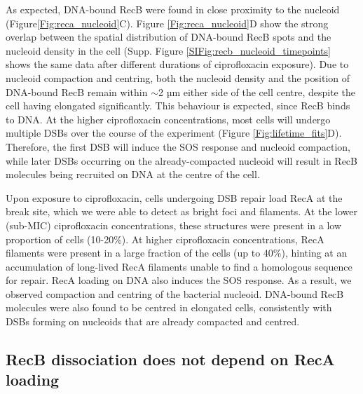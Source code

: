 As expected, DNA-bound RecB were found in close proximity to the nucleoid (Figure\ref{Fig:reca_nucleoid}C). Figure \ref{Fig:reca_nucleoid}D show the strong overlap between the spatial distribution of DNA-bound RecB spots and the nucleoid density in the cell (Supp. Figure \ref{SIFig:recb_nucleoid_timepoints} shows the same data after different durations of ciprofloxacin exposure). Due to nucleoid compaction and centring, both the nucleoid density and the position of DNA-bound RecB remain within $\sim$2 µm either side of the cell centre, despite the cell having elongated significantly. This behaviour is expected, since RecB binds to DNA. At the higher ciprofloxacin concentrations, most cells will undergo multiple DSBs over the course of the experiment (Figure \ref{Fig:lifetime_fits}D). Therefore, the first DSB will induce the SOS response and nucleoid compaction, while later DSBs occurring on the already-compacted nucleoid will result in RecB molecules being recruited on DNA at the centre of the cell.

Upon exposure to ciprofloxacin, cells undergoing DSB repair load RecA at the break site, which we were able to detect as bright foci and filaments. At the lower (sub-MIC) ciprofloxacin concentrations, these structures were present in a low proportion of cells (10-20\%). At higher ciprofloxacin concentrations, RecA filaments were present in a large fraction of the cells (up to 40\%), hinting at an accumulation of long-lived RecA filaments unable to find a homologous sequence for repair. RecA loading on DNA also induces the SOS response. As a result, we observed compaction and centring of the bacterial nucleoid. DNA-bound RecB molecules were also found to be centred in elongated cells, consistently with DSBs forming on nucleoids that are already compacted and centred.

\subsection*{RecB dissociation does not depend on RecA loading}

